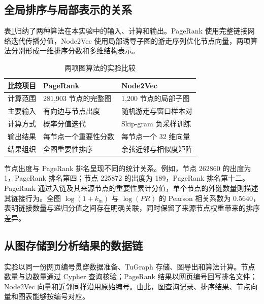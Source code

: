 \documentclass[UTF8,a4paper,12pt,fontset=windows]{ctexart}
\begin{document}
\subsection{全局排序与局部表示的关系}
表\ref{tab:comparison}归纳了两种算法在本实验中的输入、计算和输出。PageRank 使用完整链接网络迭代传播分值，Node2Vec 使用局部诱导子图的游走序列优化节点向量，两项算法分别形成一维排序分数和多维结构表示。
\begin{table}[H]
\centering
\caption{两项图算法的实验比较}\label{tab:comparison}
\begin{tabularx}{\textwidth}{l X X}
\toprule
比较项目 & PageRank & Node2Vec\\
\midrule
计算范围 & 281,903 节点的完整图 & 1,200 节点的局部子图\\
主要输入 & 有向边与节点出度 & 随机游走与窗口样本对\\
计算方式 & 概率分值迭代 & Skip-gram 负采样训练\\
输出结果 & 每节点一个重要性分数 & 每节点一个 32 维向量\\
结果组织 & 全图重要性排序 & 余弦近邻与相似度矩阵\\
\bottomrule
\end{tabularx}
\end{table}

节点出度与 PageRank 排名呈现不同的统计关系。例如，节点 262860 的出度为 1，PageRank 排名第四；节点 225872 的出度为 189，PageRank 排名第十二。PageRank 通过入链及其来源节点的重要性累计分值，单个节点的外链数量则描述其链接行为。全图 $\log(1+k_{\mathrm{in}})$ 与 $\log(PR)$ 的 Pearson 相关系数为 0.5640，表明链接数量与递归分值之间存在明确关联，同时保留了来源节点权重带来的排序差异。

\subsection{从图存储到分析结果的数据链}
实验以同一份网页编号贯穿数据准备、TuGraph 存储、图导出和算法计算。节点数量与边数量通过 Cypher 查询核验；PageRank 结果以网页编号回写排名文件；Node2Vec 向量和近邻同样沿用原始编号。由此，图查询记录、排序结果、节点向量和图表能够按编号对应。
\end{document}
